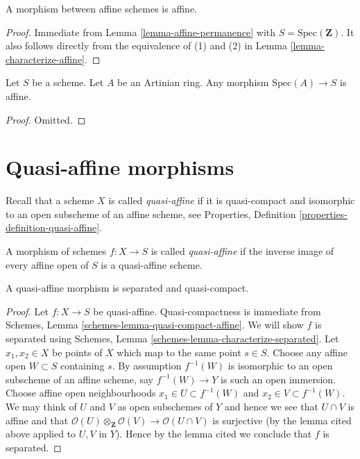 \begin{lemma}
\label{lemma-morphism-affines-affine}
A morphism between affine schemes is affine.
\end{lemma}

\begin{proof}
Immediate from Lemma \ref{lemma-affine-permanence} with
$S = \text{Spec}(\mathbf{Z})$. It also follows directly from the
equivalence of (1) and (2) in Lemma \ref{lemma-characterize-affine}.
\end{proof}

\begin{lemma}
\label{lemma-Artinian-affine}
Let $S$ be a scheme.
Let $A$ be an Artinian ring.
Any morphism $\text{Spec}(A) \to S$ is affine.
\end{lemma}

\begin{proof}
Omitted.
\end{proof}









\section{Quasi-affine morphisms}
\label{section-quasi-affine}

\noindent
Recall that a scheme $X$ is called {\it quasi-affine} if it is quasi-compact
and isomorphic to an open subscheme of an affine scheme, see
Properties, Definition \ref{properties-definition-quasi-affine}.

\begin{definition}
\label{definition-quasi-affine}
A morphism of schemes $f : X \to S$ is called {\it quasi-affine} if the
inverse image of every affine open of $S$ is a quasi-affine scheme.
\end{definition}

\begin{lemma}
\label{lemma-quasi-affine-separated}
A quasi-affine morphism is separated and quasi-compact.
\end{lemma}

\begin{proof}
Let $f : X \to S$ be quasi-affine.
Quasi-compactness is immediate from
Schemes, Lemma \ref{schemes-lemma-quasi-compact-affine}.
We will show $f$ is separated using
Schemes, Lemma \ref{schemes-lemma-characterize-separated}. Let
$x_1, x_2 \in X$ be points of $X$ which map to the same point $s \in S$.
Choose any affine open $W \subset S$ containing $s$. By assumption
$f^{-1}(W)$ is isomorphic to an open subscheme of an affine scheme,
say $f^{-1}(W) \to Y$ is such an open immersion.
Choose affine open neighbourhoods $x_1 \in U \subset f^{-1}(W)$
and $x_2 \in V \subset f^{-1}(W)$. We may think of $U$ and $V$
as open subschemes of $Y$ and hence we see that
$U \cap V$ is affine and that
$\mathcal{O}(U) \otimes_{\mathbf{Z}} \mathcal{O}(V) \to \mathcal{O}(U \cap V)$
is surjective (by the lemma cited above applied to $U, V$ in $Y$).
Hence by the lemma cited we conclude that $f$ is separated.
\end{proof}

